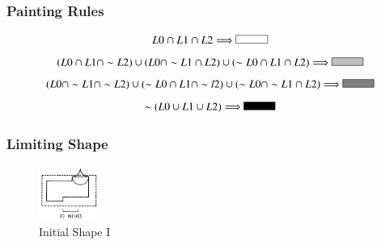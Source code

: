 \documentclass[11pt, a4paper]{report}
\begin{document}
\subsubsection{Painting Rules}
\begin{equation}
\label{fig:Shape Grammars/Shape Specification/Painting_Rule_1}
L0\cap L1\cap L2 \Longrightarrow  
\begin{tikzpicture}
\filldraw[fill=black!00!white, draw=black] (0,0) rectangle (1,0.25);
\end{tikzpicture}
\end{equation}
\begin{equation}
\label{fig:Shape Grammars/Shape Specification/Painting_Rule_2}
(L0\cap L1\cap \sim L2)\cup (L0\cap \sim L1\cap L2)\cup (\sim L0\cap L1 \cap L2) \Longrightarrow  
\begin{tikzpicture}
\filldraw[fill=black!25!white, draw=black] (0,0) rectangle (1,0.25);
\end{tikzpicture}
\end{equation}
\begin{equation}
\label{fig:Shape Grammars/Shape Specification/Painting_Rule_3}
(L0\cap \sim L1\cap \sim L2)\cup (\sim L0\cap L1\cap \sim l2)\cup (\sim L0\cap \sim L1 \cap L2) \Longrightarrow  
\begin{tikzpicture}
\filldraw[fill=black!50!white, draw=black] (0,0) rectangle (1,0.25);
\end{tikzpicture}
\end{equation}
\begin{equation}
\label{fig:Shape Grammars/Shape Specification/Painting_Rule_4}
\sim (L0\cup L1\cup L2)  \Longrightarrow  
\begin{tikzpicture}
\filldraw[fill=black!100!white, draw=black] (0,0) rectangle (1,0.25);
\end{tikzpicture}
\end{equation}
\subsubsection{Limiting Shape}
\begin{figure}
    \centering
    \includegraphics[width=2cm]{sg_specification_Limiting_shape.jpg}
    \caption{ Initial Shape I \citep{shapeGrammars:1972}}\label{fig:Shape Grammars/Shape Specification/Limiting_Shape}
\end{figure}
\pagebreak
\end{document}
